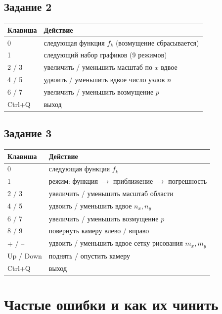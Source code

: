 \documentclass[11pt,a4paper]{report}
\begin{document}
\section{Задание 2}
\begin{center}
\begin{tabular}{ll}
\toprule
Клавиша & Действие \\
\midrule
0 & следующая функция $f_k$ (возмущение сбрасывается) \\
1 & следующий набор графиков (9 режимов) \\
2 / 3 & увеличить / уменьшить масштаб по $x$ вдвое \\
4 / 5 & удвоить / уменьшить вдвое число узлов $n$ \\
6 / 7 & увеличить / уменьшить возмущение $p$ \\
Ctrl+Q & выход \\
\bottomrule
\end{tabular}
\end{center}

\section{Задание 3}
\begin{center}
\begin{tabular}{ll}
\toprule
Клавиша & Действие \\
\midrule
0 & следующая функция $f_k$ \\
1 & режим: функция $\to$ приближение $\to$ погрешность \\
2 / 3 & увеличить / уменьшить масштаб области \\
4 / 5 & удвоить / уменьшить вдвое $n_x,n_y$ \\
6 / 7 & увеличить / уменьшить возмущение $p$ \\
8 / 9 & повернуть камеру влево / вправо \\
+ / -- & удвоить / уменьшить вдвое сетку рисования $m_x,m_y$ \\
Up / Down & поднять / опустить камеру \\
Ctrl+Q & выход \\
\bottomrule
\end{tabular}
\end{center}

\chapter{Частые ошибки и как их чинить}
\end{document}
